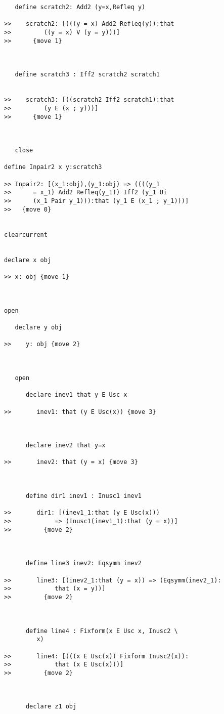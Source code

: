 \documentclass[12pt]{article}
\begin{document}
\begin{verbatim}
   define scratch2: Add2 (y=x,Refleq y)

>>    scratch2: [(((y = x) Add2 Refleq(y)):that
>>         ((y = x) V (y = y)))]
>>      {move 1}



   define scratch3 : Iff2 scratch2 scratch1


>>    scratch3: [((scratch2 Iff2 scratch1):that
>>         (y E (x ; y)))]
>>      {move 1}



   close

define Inpair2 x y:scratch3

>> Inpair2: [(x_1:obj),(y_1:obj) => ((((y_1
>>      = x_1) Add2 Refleq(y_1)) Iff2 (y_1 Ui
>>      (x_1 Pair y_1))):that (y_1 E (x_1 ; y_1)))]
>>   {move 0}


clearcurrent


declare x obj

>> x: obj {move 1}



open

   declare y obj

>>    y: obj {move 2}



   open

      declare inev1 that y E Usc x

>>       inev1: that (y E Usc(x)) {move 3}



      declare inev2 that y=x

>>       inev2: that (y = x) {move 3}



      define dir1 inev1 : Inusc1 inev1

>>       dir1: [(inev1_1:that (y E Usc(x)))
>>            => (Inusc1(inev1_1):that (y = x))]
>>         {move 2}



      define line3 inev2: Eqsymm inev2

>>       line3: [(inev2_1:that (y = x)) => (Eqsymm(inev2_1):
>>            that (x = y))]
>>         {move 2}



      define line4 : Fixform(x E Usc x, Inusc2 \
         x)

>>       line4: [(((x E Usc(x)) Fixform Inusc2(x)):
>>            that (x E Usc(x)))]
>>         {move 2}



      declare z1 obj


\end{verbatim}
\end{document}
